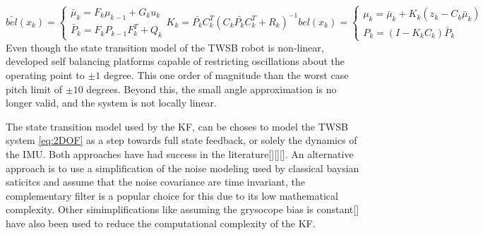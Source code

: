         \begin{subequations}
            \begin{equation}
                \bar{bel}(x_k) = \begin{cases}
                        \bar{\mu}_k = F_k \mu_{k-1} + G_k u_k \\
                        \bar{P}_k = F_k P_{k-1} F_k^T + Q_k
                        \end{cases}
                \label{eq:KalmanPredict}
            \end{equation}
            \begin{equation}
                K_k = \bar{P_k} C_k^T \left(C_k \bar{P_k} C_k^T + R_k \right)^{-1}
                \label{eq:KalmanGain}
            \end{equation}
            \begin{equation}
            bel(x_k) = \begin{cases}
                \mu_k = \bar{\mu}_k + K_k \left(z_k - C_k \bar{\mu}_k \right) \\
                P_k = \left(I - K_k C_k \right) \bar{P}_k
            \end{cases}
            \label{eq:KalmanUpdate}
            \end{equation}
            \label{eq:KalmanAlgorithm}
        \end{subequations}
        Even though the state transition model of the TWSB robot is non-linear, 
        \cite{SelfContainedMobileTWSB} \cite{ooi2003balancing} 
        developed self balancing platforms capable of restricting oscillations about the 
        operating point to $±1$ degree. This one order of magnitude than the worst case pitch limit of $±10$ degrees.
        Beyond this, the small angle approximation is no longer valid, and the system is not locally linear. 

        The state transition model used by the KF, can be choses to model the TWSB system \ref{eq:2DOF} as a step towards 
        full state feedback, or solely the dynamics of the IMU.  Both approaches have had success in the literature[][][]. 
        An alternative approach is to use a simplification of the noise modeling used by classical baysian saticitcs and 
        assume that the noise covariance are time invariant, the complementary filter \cite{ComplimentaryKalman} 
        is a popular choice for this due to its low mathematical complexity. Other simimplifications like assuming the grysocope 
        bias is constant[] have also been used to reduce the computational complexity of the KF.

